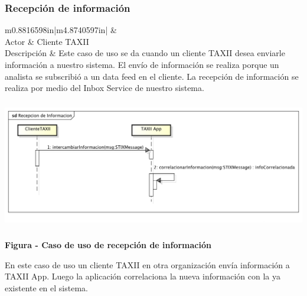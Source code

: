 \newpage
\subsubsection{Recepción de información}
\begin{flushleft}
	\tablefirsthead{}
	\tablehead{}
	\tabletail{}
	\tablelasttail{}
	\begin{supertabular}{m{0.8816598in}|m{4.8740597in}|}
		 &
		\\\hline
		{ Actor} &
		{ Cliente TAXII}\\
		{ Descripción} &
		{ Este caso de uso se da cuando un cliente TAXII desea enviarle información a
			nuestro sistema. El envío de información se realiza porque un analista se subscribió a un data feed en el cliente. La
			recepción de información se realiza por medio del Inbox Service de nuestro sistema.}\\\hhline{~-}
	\end{supertabular}
\end{flushleft}
\begin{center}
	\includegraphics[width=5.7638in,height=2.2256in]{Analisis22-img/Analisis22-img028.png} 
	{\centering{}\bfseries
		\foreignlanguage{spanish}{Figura }\foreignlanguage{spanish}{ - Caso de uso de recepción
			de información}
		\par}
\end{center}

{
	En este caso de uso un cliente TAXII en otra organización envía información a TAXII App. Luego la aplicación
	correlaciona la nueva información con la ya existente en el sistema.}
\newpage
